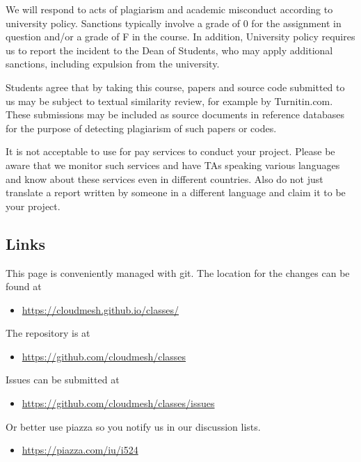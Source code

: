 We will respond to acts of plagiarism and academic misconduct
according to university policy. Sanctions typically involve a grade of
0 for the assignment in question and/or a grade of F in the course. In
addition, University policy requires us to report the incident to the
Dean of Students, who may apply additional sanctions, including
expulsion from the university.

Students agree that by taking this course, papers and source code
submitted to us may be subject to textual similarity review, for
example by Turnitin.com. These submissions may be included as source
documents in reference databases for the purpose of detecting
plagiarism of such papers or codes.

It is not acceptable to use for pay services to conduct your project.
Please be aware that we monitor such services and have TAs speaking
various languages and know about these services even in different
countries. Also do not just translate a report written by someone in a
different language and claim it to be your project.


\subsection{Links}
\label{\detokenize{i524/index:links}}
This page is conveniently managed with git. The location for the
changes can be found at
\begin{itemize}
\item {} 
\url{https://cloudmesh.github.io/classes/}

\end{itemize}

The repository is at
\begin{itemize}
\item {} 
\url{https://github.com/cloudmesh/classes}

\end{itemize}

Issues can be submitted at
\begin{itemize}
\item {} 
\url{https://github.com/cloudmesh/classes/issues}

\end{itemize}

Or better use piazza so you notify us in our discussion lists.
\begin{itemize}
\item {} 
\url{https://piazza.com/iu/i524}

\end{itemize}


